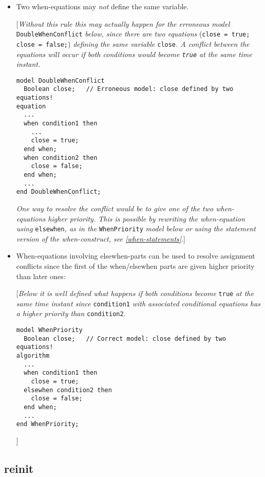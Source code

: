 \begin{itemize}
\item  Two when-equations may \emph{not} define the same variable.

{[}\emph{Without this rule this may actually happen for the erroneous
model} \lstinline!DoubleWhenConflict! \emph{below, since there are two equations}
(\lstinline!close = true; close = false;!) \emph{defining the same variable}
\lstinline!close!\emph{. A conflict between the equations will occur if both
conditions would become \lstinline!true! at the same time instant.}

\begin{lstlisting}[language=modelica]
model DoubleWhenConflict
  Boolean close;   // Erroneous model: close defined by two equations!
equation
  ...
  when condition1 then
    ...
    close = true;
  end when;
  when condition2 then
    close = false;
  end when;
  ...
end DoubleWhenConflict;
\end{lstlisting}

\emph{One way to resolve the conflict would be to give one of the two
when-equations higher priority. This is possible by rewriting the
when-equation using} \lstinline!elsewhen!\emph{, as in the} \lstinline!WhenPriority! \emph{model
below or using the statement version of the when-construct, see \autoref{when-statements}}.{]}

\item  When-equations involving elsewhen-parts can be used to resolve
  assignment conflicts since the first of the when/elsewhen parts are
  given higher priority than later ones:

{[}\emph{Below it is well defined what happens if both conditions
become} \lstinline!true! \emph{at the same time instant since} \lstinline!condition1! \emph{with
associated conditional equations has a higher priority than} \lstinline!condition2!.

\begin{lstlisting}[language=modelica]
model WhenPriority
  Boolean close;   // Correct model: close defined by two equations!
algorithm
  ...
  when condition1 then
    close = true;
  elsewhen condition2 then
    close = false;
  end when;
  ...
end WhenPriority;
\end{lstlisting}
{]}
\end{itemize}
\subsection{reinit}

